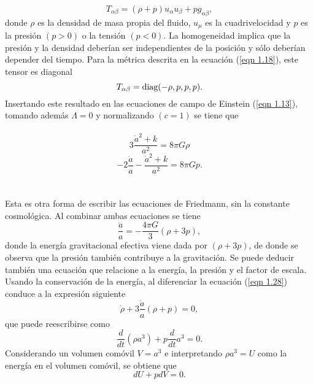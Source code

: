\documentclass[a4paper,openright,10pt, oneside, final]{book}
\begin{document}
\begin{equation}
T_{\alpha \beta} =
(\rho + p)u_{\alpha}u_{\beta} + pg_{\alpha \beta},\label{eqn 1.26}
\end{equation}
donde $\rho$ es la densidad de masa propia del fluido, $u_{\mu}$ es la cuadrivelocidad y $p$ es la presión $(p > 0)$ o la tensión $(p < 0)$. La homogeneidad implica que la presión y la densidad deberían ser independientes de la posición y sólo deberían depender del tiempo. Para la métrica descrita en la ecuación (\ref{eqn 1.18}), este tensor es diagonal 
\begin{equation}
T_{\alpha \beta} = \textup{diag}(-\rho, p, p, p).\label{eqn 1.27}
\end{equation}
Insertando este resultado en las ecuaciones de campo de Einstein (\ref{eqn 1.13}), tomando además $\Lambda = 0$ y normalizando $(c = 1)$ se tiene que\\\\
\begin{equation*}
 3\frac{\dot{a}^{2} + k}{a^{2}}  = 8 \pi G \rho
 \end{equation*}
\begin{equation} 
-2\frac{\ddot{a}}{a} - \frac{\dot{a}^{2} + k}{a^{2}}= 8 \pi G p.\label{eqn 1.28}
\end{equation}\\\\
Esta es otra forma de escribir las ecuaciones de Friedmann, sin la constante cosmológica. Al combinar ambas ecuaciones se tiene
\begin{equation}
\frac{\ddot{a}}{a} = -\frac{4 \pi G}{3}(\rho + 3p), \label{eqn 1.29}
\end{equation}
donde la energía gravitacional efectiva viene dada por $(\rho + 3p)$, de donde se observa que la presión también contribuye a la gravitación. Se puede deducir también una ecuación que relacione a la energía, la presión y el factor de escala. Usando la conservación de la energía, al diferenciar la ecuación (\ref{eqn 1.28}) conduce a la expresión siguiente
\begin{equation}
\dot{\rho} + 3\frac{\dot{a}}{a}(\rho + p) = 0,\label{eqn 1.30}
\end{equation}
que puede reescribirse como
\begin{equation}
\frac{d}{dt} (\rho a^{3}) + p\frac{d}{dt}a^{3} = 0.\label{eqn 1.31}
\end{equation}
Considerando un volumen comóvil $V = a^{3}$ e interpretando $\rho a^{3} = U$ como la energía en el volumen comóvil, se obtiene que
\begin{equation}
dU + pdV = 0. \label{eqn 1.32}
\end{equation}
\end{document}
